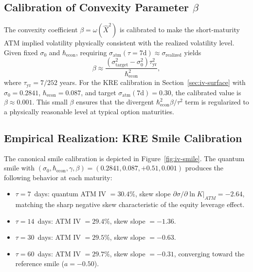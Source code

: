 \subsection{Calibration of Convexity Parameter $\beta$}

The convexity coefficient $\beta = \omega(\hat{X}^2)$ is calibrated to make the
short-maturity ATM implied volatility physically consistent with the realized
volatility level. Given fixed $\sigma_0$ and $\hbar_{\mathrm{econ}}$, requiring
$\sigma_{\mathrm{atm}}(\tau=7\text{d}) \approx \sigma_{\text{realized}}$ yields
\begin{equation*}
    \beta \approx \frac{\left(\sigma_{\mathrm{target}}^2 - \sigma_0^2\right) \tau_{\mathrm{yr}}^2}
        {\hbar_{\mathrm{econ}}^2},
\end{equation*}
where $\tau_{\mathrm{yr}} = 7/252$ years. For the KRE calibration in
Section~\ref{sec:iv-surface} with $\sigma_0 = 0.2841$,
$\hbar_{\mathrm{econ}} = 0.087$, and target $\sigma_{\mathrm{atm}}(7\text{d})
= 0.30$, the calibrated value is $\beta \approx 0.001$. This small $\beta$
ensures that the divergent $\hbar_{\mathrm{econ}}^2 \beta / \tau^2$ term is
regularized to a physically reasonable level at typical option maturities.

\subsection{Empirical Realization: KRE Smile Calibration}

The canonical smile calibration is depicted in Figure~\ref{fig:iv-smile}. The
quantum smile with $(\sigma_0, \hbar_{\mathrm{econ}}, \gamma, \beta) = (0.2841,
0.087, +0.51, 0.001)$ produces the following behavior at each maturity:

\begin{itemize}
    \item $\tau = 7$~days: quantum ATM IV $= 30.4\%$, skew slope
        $\partial\sigma/\partial\ln K \big|_{ATM} = -2.64$, matching the sharp
        negative skew characteristic of the equity leverage effect.
    \item $\tau = 14$~days: ATM IV $= 29.4\%$, skew slope $= -1.36$.
    \item $\tau = 30$~days: ATM IV $= 29.5\%$, skew slope $= -0.63$.
    \item $\tau = 60$~days: ATM IV $= 29.7\%$, skew slope $= -0.31$,
        converging toward the reference smile ($a = -0.50$).
\end{itemize}

